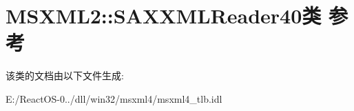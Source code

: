 \hypertarget{class_m_s_x_m_l2_1_1_s_a_x_x_m_l_reader40}{}\section{M\+S\+X\+M\+L2\+:\+:S\+A\+X\+X\+M\+L\+Reader40类 参考}
\label{class_m_s_x_m_l2_1_1_s_a_x_x_m_l_reader40}


该类的文档由以下文件生成\+:\begin{DoxyCompactItemize}
\item 
E\+:/\+React\+O\+S-\/0../dll/win32/msxml4/msxml4\+\_\+tlb.\+idl\end{DoxyCompactItemize}
